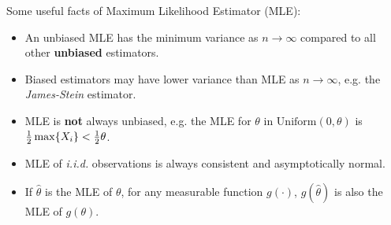 Some useful facts of Maximum Likelihood Estimator (MLE): 
\begin{itemize}
	\item An unbiased MLE has the minimum variance as $n \rightarrow \infty$ compared to all other \textbf{unbiased} estimators. 
	\item Biased estimators may have lower variance than MLE as $n \rightarrow \infty$, e.g. the \emph{James-Stein} estimator. 
	\item MLE is \textbf{not} always unbiased, e.g. the MLE for $\theta$ in $\mathrm{Uniform}(0, \theta)$ is $\frac{1}{2} \max\{X_i\} < \frac{1}{2} \theta $.
	\item MLE of \emph{i.i.d.} observations is always consistent and asymptotically normal.
	\item  If $\hat{\theta}$ is the MLE of $\theta$, for any measurable function $g(\cdot)$, $g(\hat{\theta})$ is also the MLE of $g(\theta)$.
\end{itemize}

